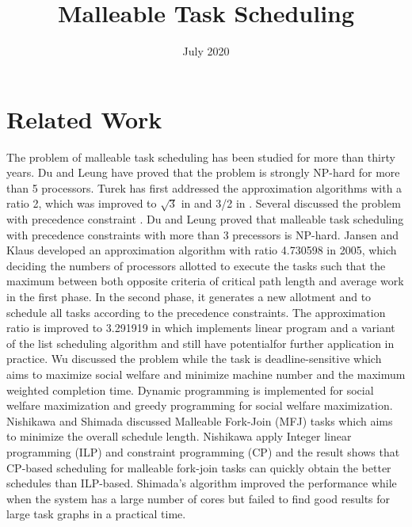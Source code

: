 \documentclass{article}
\author{}
\date{July 2020}
\title{Malleable Task Scheduling}
\begin{document}
    \maketitle
    \section{Related Work}

    The problem of malleable task scheduling has been studied for more than thirty years. Du and Leung 		 
	\cite{du1989complexity} have proved that the problem is strongly NP-hard for more than 5 processors.
	Turek \cite{turek1992approximate} has first addressed the approximation algorithms with a ratio 2,
	which was improved to $\sqrt{3}$ in \cite{mounie1999efficient} and 3/2 in \cite{mounie20023}.
	\newline
	\newline
	Several discussed the problem with precedence constraint \cite{Gunther2009Sep}\cite{Jansen2006Jul}
	\cite{Jansen2012Jan}\cite{Nishikawa2018Nov}. Du and Leung\cite{du1989complexity} proved that malleable 
	task scheduling with precedence constraints with more than 3 precessors is NP-hard. Jansen and Klaus
	\cite{Jansen2006Jul} developed an approximation algorithm with ratio 4.730598 in 2005, which deciding 
	the numbers of processors allotted to execute the tasks such that the maximum between both opposite 
	criteria of critical path length and average work in the first phase. In the second phase, it 
	generates a new allotment and to schedule all tasks according to the precedence constraints.
	The approximation ratio is improved to 3.291919 in \cite{Jansen2012Jan} which implements linear 
	program and a variant of the list scheduling algorithm and still have potentialfor further application in practice. Wu discussed the 
	problem while the task is deadline-sensitive which aims to maximize social welfare and minimize 
	machine number and the maximum weighted completion time. Dynamic programming is implemented for 
	social welfare maximization and greedy programming for social welfare maximization\cite{WuXiaohu2015AfSM}.
	\newline
	\newline
	Nishikawa and Shimada discussed Malleable Fork-Join (MFJ) tasks which
	aims to minimize the overall schedule length.\cite{Nishikawa2018Nov}\cite{Shimada2019Nov} Nishikawa apply Integer linear 
	programming (ILP) and constraint programming (CP) and the result shows that CP-based scheduling for 	
	malleable fork-join tasks can quickly obtain the better schedules than ILP-based\cite{Nishikawa2018Nov}. Shimada's algorithm 
	 improved the performance while when the system has a large number of cores
	but failed to find good results for large task graphs in a practical time\cite{Shimada2019Nov}.
	
	
	
\end{document}
